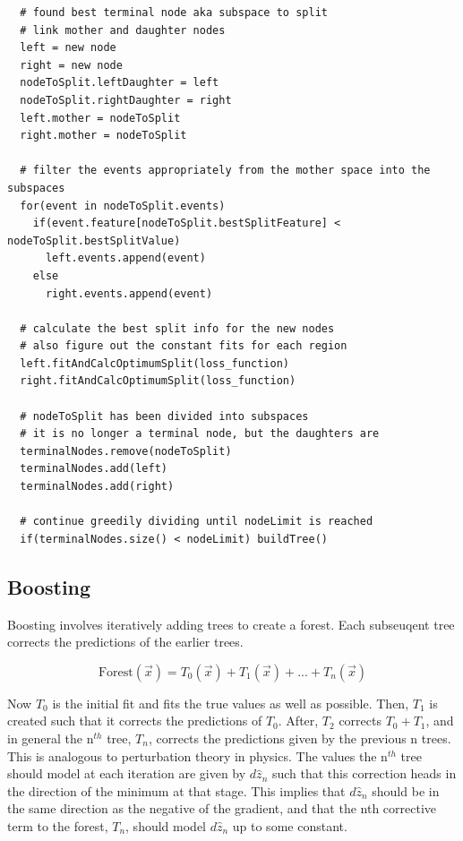 \documentclass[12pt]{article}
\begin{document}
\begin{verbatim}
  # found best terminal node aka subspace to split
  # link mother and daughter nodes
  left = new node
  right = new node
  nodeToSplit.leftDaughter = left
  nodeToSplit.rightDaughter = right
  left.mother = nodeToSplit
  right.mother = nodeToSplit

  # filter the events appropriately from the mother space into the subspaces
  for(event in nodeToSplit.events)
    if(event.feature[nodeToSplit.bestSplitFeature] < nodeToSplit.bestSplitValue)
      left.events.append(event)
    else 
      right.events.append(event)

  # calculate the best split info for the new nodes
  # also figure out the constant fits for each region
  left.fitAndCalcOptimumSplit(loss_function)
  right.fitAndCalcOptimumSplit(loss_function)

  # nodeToSplit has been divided into subspaces
  # it is no longer a terminal node, but the daughters are
  terminalNodes.remove(nodeToSplit)
  terminalNodes.add(left)
  terminalNodes.add(right)

  # continue greedily dividing until nodeLimit is reached
  if(terminalNodes.size() < nodeLimit) buildTree()

\end{verbatim}

\subsection{Boosting}

Boosting involves iteratively adding trees to create a forest. Each subseuqent tree corrects the predictions of the earlier trees. 

\begin{equation}
\textrm{Forest}(\vec{x}) = T_0(\vec{x}) + T_1(\vec{x}) + ... + T_n(\vec{x})
\end{equation}

Now $T_0$ is the initial fit and fits the true values as well as possible. Then, $T_1$ is created such that it corrects the predictions of $T_0$. After, $T_2$ corrects $T_0 + T_1$, and in general the n$^{th}$ tree, $T_n$, corrects the predictions given by the previous n trees. This is analogous to perturbation theory in physics. The values the n$^{th}$ tree should model at each iteration are given by $d\hat{z}_{n}$ such that this correction heads in the direction of the minimum at that stage. This implies that $d\hat{z}_{n}$ should be in the same direction as the negative of the gradient, and that the nth corrective term to the forest, $T_n$, should model $d\hat{z}_{n}$ up to some constant.
\end{document}
